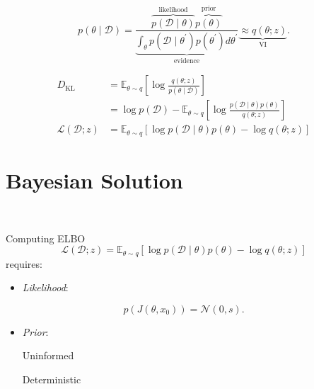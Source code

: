 \documentclass[
]{report}
\providecommand{\tightlist}{%
  \setlength{\itemsep}{0pt}\setlength{\parskip}{0pt}}\usepackage{longtable,booktabs,array}
\begin{document}
~ \[
p(\theta \mid \mathcal{D}) = \frac{\overbrace{p(\mathcal{D} \mid
\theta)}^{\text{likelihood}}\overbrace{p(\theta)}^{\text{prior}}}
{\underbrace{\int_\theta p(\mathcal{D} \mid \theta^\prime)p(\theta^\prime)
d\theta^\prime}_{\text{evidence}}} \underbrace{\approx q(\theta;
z)}_{\text{VI}}.
\]

\begin{tcolorbox}[enhanced jigsaw, opacityback=0, breakable, leftrule=.75mm, toptitle=1mm, rightrule=.15mm, toprule=.15mm, bottomrule=.15mm, opacitybacktitle=0.6, colbacktitle=quarto-callout-important-color!10!white, colframe=quarto-callout-important-color-frame, title={KL-divergence and ELBO}, bottomtitle=1mm, left=2mm, colback=white, arc=.35mm, titlerule=0mm, coltitle=black]
\[
\begin{aligned}
D_{\text{KL}} &= \mathbb{E}_{\theta \sim q}\left[ \log \frac{q(\theta;
z)}{p(\theta \mid \mathcal{D})}\right] \\
&= \log p(\mathcal{D}) - \mathbb{E}_{\theta \sim q}\left[ \log
\frac{p(\mathcal{D} \mid \theta) p(\theta)}{q(\theta; z)} \right] \\
\mathcal{L}(\mathcal{D}; z) &= \mathbb{E}_{\theta \sim q}\left[ \log
p(\mathcal{D} \mid \theta) p(\theta) - \log q(\theta; z) \right]
\end{aligned}
\]
\end{tcolorbox}

\hypertarget{bayesian-solution}{%
\section{Bayesian Solution}\label{bayesian-solution}}

~

Computing ELBO
\[ \mathcal{L}(\mathcal{D};z) = \mathbb{E}_{\theta \sim q}\left[ \log p(\mathcal{D} \mid \theta)p(\theta) - \log q(\theta; z)  \right] \]
requires:

\begin{itemize}
\tightlist
\item
  \emph{Likelihood}:
\end{itemize}

\[ p( J(\theta, x_0)) = \mathcal{N}(0, s). 
\]

\begin{itemize}
\tightlist
\item
  \emph{Prior}:

  Uninformed

  Deterministic
\end{itemize}
\end{document}
